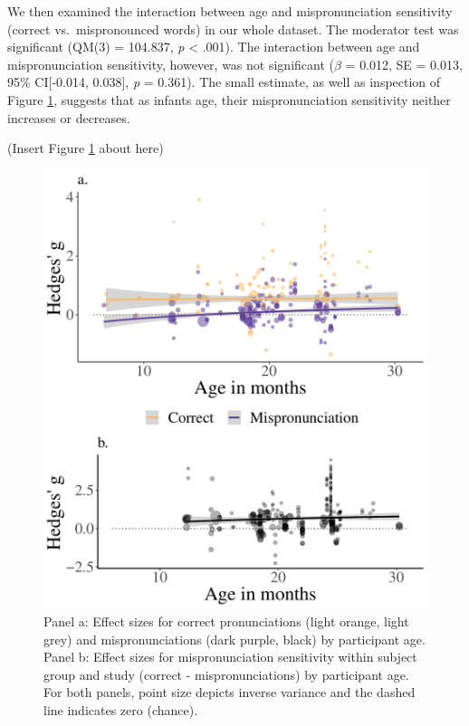 \documentclass[
  english,
  man, noextraspace]{apa6}
\begin{document}
We then examined the interaction between age and mispronunciation sensitivity (correct vs.~mispronounced words) in our whole dataset. The moderator test was significant (QM(3) = 104.837, \emph{p} \textless{} .001). The interaction between age and mispronunciation sensitivity, however, was not significant (\(\beta\) = 0.012, SE = 0.013, 95\% CI{[}-0.014, 0.038{]}, \emph{p} = 0.361). The small estimate, as well as inspection of Figure \ref{fig:PlotMPEffect}, suggests that as infants age, their mispronunciation sensitivity neither increases or decreases.

(Insert Figure \ref{fig:PlotMPEffect} about here)

\begin{figure}
\centering
\includegraphics{VonHolzenBergmann_MPMetaAnalysis_files/figure-latex/PlotMPEffect-1.pdf}
\caption{\label{fig:PlotMPEffect}Panel a: Effect sizes for correct pronunciations (light orange, light grey) and mispronunciations (dark purple, black) by participant age. Panel b: Effect sizes for mispronunciation sensitivity within subject group and study (correct - mispronunciations) by participant age. For both panels, point size depicts inverse variance and the dashed line indicates zero (chance).}
\end{figure}
\end{document}

